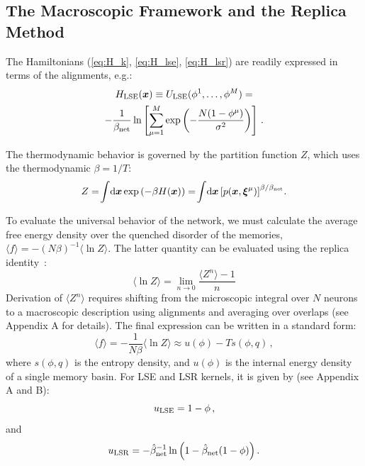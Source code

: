 \documentclass{article}
\newcommand{\dd}{{\mathrm{d}}}
\theoremstyle{plain}
\theoremstyle{definition}
\theoremstyle{remark}
\begin{document}
\subsection{The Macroscopic Framework and the Replica Method}

The Hamiltonians (\ref{eq:H_k}, \ref{eq:H_lse}, \ref{eq:H_lsr}) are readily expressed in terms of the alignments, e.g.:
\begin{multline}
    H_{\rm LSE}(\bm{x}) \equiv U_{\rm LSE}(\phi^1, \dots, \phi^M) = \\ -\frac{1}{\beta_{\rm net}} \ln \left[ \sum_{\mu=1}^M \exp\left( -\frac{N(1 - \phi^\mu)}{\sigma^2} \right) \right]\,.
\end{multline}

The thermodynamic behavior is governed by the partition function $Z$, which uses the thermodynamic $\beta = 1/T$:
\begin{equation}
    Z = \!\int\!\dd \bm{x} \exp\left( -\beta H(\bm{x}) \right) = \!\int\! \dd \bm{x} \left[ p(\bm{x}, \bm{\xi}^\mu) \right]^{\beta/\beta_{\rm net}}\!.
    \label{eq:partition}
\end{equation}

To evaluate the universal behavior of the network, we must calculate the average free energy density over the quenched disorder of the memories, $\langle f \rangle = -(N\beta)^{-1} \langle \ln Z \rangle$. The latter quantity can be evaluated using the replica identity~\cite{sk75}:
\begin{equation}
    \langle \ln Z \rangle = \lim_{n \to 0} \frac{\langle Z^n \rangle - 1}{n}
    \label{eq:limit}
\end{equation}
Derivation of $\langle Z^n \rangle$ requires shifting from the microscopic integral over $N$ neurons to a macroscopic description using alignments and averaging over overlaps (see Appendix A for details). The final expression can be written in a standard form:
\begin{equation}
    \langle f \rangle = -\frac{1}{N\beta} \langle \ln Z \rangle 
    \approx  u(\phi) - T s(\phi, q)\,,
\end{equation}
where  $s(\phi, q)$ is the entropy density, and $u(\phi)$ is the internal energy density of a single memory basin. For LSE and LSR kernels, it is given by (see Appendix A and B):
\begin{equation}
    u_{\rm LSE} = 1-\phi\,,
\end{equation}
and 
\begin{equation}
    u_{\rm LSR} = -\hat\beta^{-1}_{\rm net} \ln \Big(1 - \hat\beta_{\rm net} (1-\phi) \Big)\,.
\end{equation}
\end{document}
